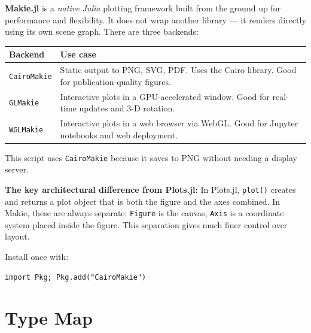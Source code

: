 \documentclass[12pt, a4paper]{article}
\newcommand{\cd}[1]{\texttt{#1}}
\begin{document}
\textbf{Makie.jl} is a \emph{native Julia} plotting framework
built from the ground up for performance and flexibility.
It does not wrap another library --- it renders directly
using its own scene graph.
There are three backends:

\begin{center}
\begin{tabular}{lp{8.5cm}}
\toprule
Backend & Use case \\
\midrule
\cd{CairoMakie} &
  Static output to PNG, SVG, PDF.
  Uses the Cairo library. Good for publication-quality figures. \\
\cd{GLMakie} &
  Interactive plots in a GPU-accelerated window.
  Good for real-time updates and 3-D rotation. \\
\cd{WGLMakie} &
  Interactive plots in a web browser via WebGL.
  Good for Jupyter notebooks and web deployment. \\
\bottomrule
\end{tabular}
\end{center}

This script uses \cd{CairoMakie} because it saves to PNG
without needing a display server.

\textbf{The key architectural difference from Plots.jl:}
In Plots.jl, \cd{plot()} creates and returns a plot object
that is both the figure and the axes combined.
In Makie, these are always separate:
\cd{Figure} is the canvas, \cd{Axis} is a coordinate system
placed inside the figure.
This separation gives much finer control over layout.

Install once with:
\begin{verbatim}
import Pkg; Pkg.add("CairoMakie")
\end{verbatim}


\section{Type Map}

\end{document}
